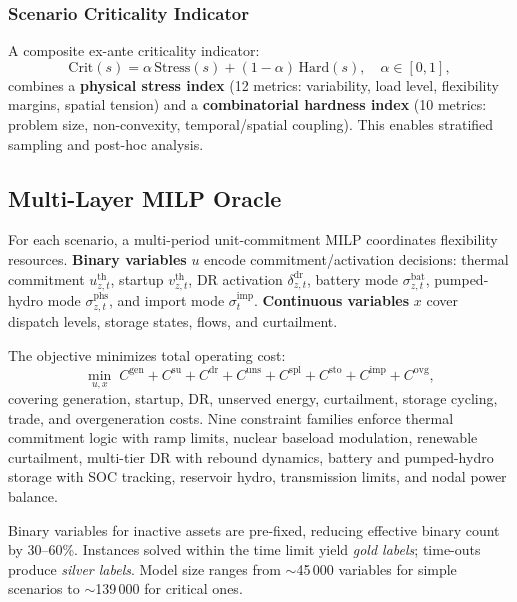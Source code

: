 \documentclass{article}
\begin{document}
\subsubsection{Scenario Criticality Indicator}
\label{sec:criticality}

A composite ex-ante criticality indicator:
\begin{equation}
\mathrm{Crit}(s) = \alpha \, \mathrm{Stress}(s) + (1-\alpha) \, \mathrm{Hard}(s), \quad \alpha \in [0,1],
\end{equation}
combines a \textbf{physical stress index} (12 metrics: variability, load level, flexibility margins, spatial tension) and a \textbf{combinatorial hardness index} (10 metrics: problem size, non-convexity, temporal/spatial coupling). This enables stratified sampling and post-hoc analysis.

\subsection{Multi-Layer MILP Oracle}
\label{sec:milp_oracle}

For each scenario, a multi-period unit-commitment MILP coordinates flexibility resources. \textbf{Binary variables} $u$ encode commitment/activation decisions: thermal commitment $u^{\mathrm{th}}_{z,t}$, startup $v^{\mathrm{th}}_{z,t}$, DR activation $\delta^{\mathrm{dr}}_{z,t}$, battery mode $\sigma^{\mathrm{bat}}_{z,t}$, pumped-hydro mode $\sigma^{\mathrm{phs}}_{z,t}$, and import mode $\sigma^{\mathrm{imp}}_{t}$. \textbf{Continuous variables} $x$ cover dispatch levels, storage states, flows, and curtailment.

The objective minimizes total operating cost:
\begin{equation}
\min_{u,x} \; C^{\mathrm{gen}} + C^{\mathrm{su}} + C^{\mathrm{dr}} + C^{\mathrm{uns}} + C^{\mathrm{spl}} + C^{\mathrm{sto}} + C^{\mathrm{imp}} + C^{\mathrm{ovg}},
\end{equation}
covering generation, startup, DR, unserved energy, curtailment, storage cycling, trade, and overgeneration costs. Nine constraint families enforce thermal commitment logic with ramp limits, nuclear baseload modulation, renewable curtailment, multi-tier DR with rebound dynamics, battery and pumped-hydro storage with SOC tracking, reservoir hydro, transmission limits, and nodal power balance.

Binary variables for inactive assets are pre-fixed, reducing effective binary count by 30--60\%. Instances solved within the time limit yield \emph{gold labels}; time-outs produce \emph{silver labels}. Model size ranges from $\sim$45\,000 variables for simple scenarios to $\sim$139\,000 for critical ones.
\end{document}
